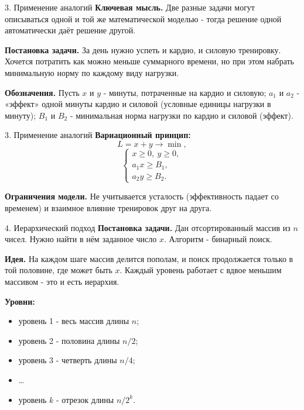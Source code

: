 \documentclass{beamer}
\begin{document}
    \begin{frame}{3. Применение аналогий}
        \textbf{Ключевая мысль.} Две разные задачи могут описываться одной и той же
        математической моделью - тогда решение одной автоматически даёт
        решение другой.

        \medskip
        \textbf{Постановка задачи.} За день нужно успеть и кардио, и силовую
        тренировку. Хочется потратить как можно меньше суммарного времени,
        но при этом набрать минимальную норму по каждому виду нагрузки.

        \medskip
        \textbf{Обозначения.} Пусть $x$ и $y$ - минуты, потраченные на кардио
        и силовую; $a_1$ и $a_2$ - «эффект» одной минуты кардио
        и силовой (условные единицы нагрузки в минуту); $B_1$ и $B_2$ -
        минимальная норма нагрузки по кардио и силовой (эффект).
    \end{frame}

    \begin{frame}{3. Применение аналогий}
        \textbf{Вариационный принцип:}
        \[
            L = x + y \to \min,
        \]
        \[
            \begin{cases}
                x \ge 0,\ y \ge 0, \\
                a_1 x \ge B_1, \\
                a_2 y \ge B_2.
            \end{cases}
        \]

        \medskip
        \textbf{Ограничения модели.} Не учитывается усталость (эффективность
        падает со временем) и взаимное влияние тренировок друг на друга.
    \end{frame}

    \begin{frame}{4. Иерархический подход}
        \textbf{Постановка задачи.} Дан отсортированный массив из $n$ чисел.
        Нужно найти в нём заданное число $x$. Алгоритм - бинарный поиск.

        \medskip
        \textbf{Идея.} На каждом шаге массив делится пополам, и поиск
        продолжается только в той половине, где может быть $x$.
        Каждый уровень работает с вдвое меньшим массивом - это и есть иерархия.

        \medskip
        \textbf{Уровни:}
        \begin{itemize}
            \item уровень 1 - весь массив длины $n$;
            \item уровень 2 - половина длины $n/2$;
            \item уровень 3 - четверть длины $n/4$;
            \item \dots
            \item уровень $k$ - отрезок длины $n/2^k$.
        \end{itemize}
    \end{frame}
\end{document}
